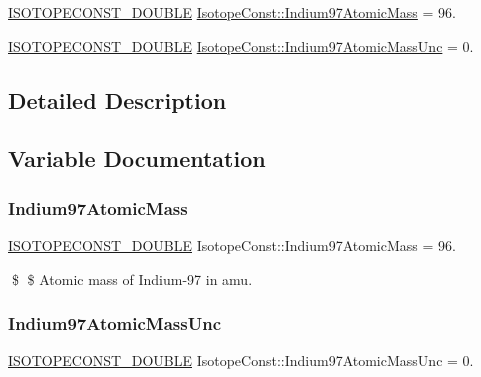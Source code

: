 \begin{DoxyCompactItemize}
\item 
\mbox{\hyperlink{group___isotope_const-_macros_ga8f45a7272ce02c0b4c65c44636ed719a}{I\+S\+O\+T\+O\+P\+E\+C\+O\+N\+S\+T\+\_\+\+D\+O\+U\+B\+LE}} \mbox{\hyperlink{group___isotope_const-_indium-_in97_ga8d8d71437a9a1b6a874a07dd29d3472c}{Isotope\+Const\+::\+Indium97\+Atomic\+Mass}} = 96.
\item 
\mbox{\hyperlink{group___isotope_const-_macros_ga8f45a7272ce02c0b4c65c44636ed719a}{I\+S\+O\+T\+O\+P\+E\+C\+O\+N\+S\+T\+\_\+\+D\+O\+U\+B\+LE}} \mbox{\hyperlink{group___isotope_const-_indium-_in97_ga7553be8317d8b76242355a4072490c08}{Isotope\+Const\+::\+Indium97\+Atomic\+Mass\+Unc}} = 0.
\end{DoxyCompactItemize}


\subsection{Detailed Description}


\subsection{Variable Documentation}
\mbox{\label{group___isotope_const-_indium-_in97_ga8d8d71437a9a1b6a874a07dd29d3472c}} 
\subsubsection{\texorpdfstring{Indium97\+Atomic\+Mass}{Indium97AtomicMass}}
{\footnotesize\ttfamily \mbox{\hyperlink{group___isotope_const-_macros_ga8f45a7272ce02c0b4c65c44636ed719a}{I\+S\+O\+T\+O\+P\+E\+C\+O\+N\+S\+T\+\_\+\+D\+O\+U\+B\+LE}} Isotope\+Const\+::\+Indium97\+Atomic\+Mass = 96.}

\$ \$ Atomic mass of Indium-\/97 in amu. \mbox{\label{group___isotope_const-_indium-_in97_ga7553be8317d8b76242355a4072490c08}} 
\subsubsection{\texorpdfstring{Indium97\+Atomic\+Mass\+Unc}{Indium97AtomicMassUnc}}
{\footnotesize\ttfamily \mbox{\hyperlink{group___isotope_const-_macros_ga8f45a7272ce02c0b4c65c44636ed719a}{I\+S\+O\+T\+O\+P\+E\+C\+O\+N\+S\+T\+\_\+\+D\+O\+U\+B\+LE}} Isotope\+Const\+::\+Indium97\+Atomic\+Mass\+Unc = 0.}

